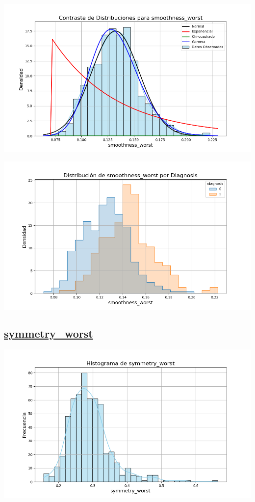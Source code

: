 \documentclass[a4paper, 12pt]{article}
\begin{document}
\includegraphics[width=\textwidth]{../Plots/plots_stats/smoothness_worst/distribuciones_conocidas_smoothness_worst.png}

\includegraphics[width=\textwidth]{../Plots/plots_diagnosis/distribucion_smoothness_worst_por_diagnosis.png}

\subsection*{\underline{symmetry\_worst}}

	\includegraphics[width=\textwidth]{../Plots/plots_stats/symmetry_worst/histograma_symmetry_worst.png}
\end{document}
